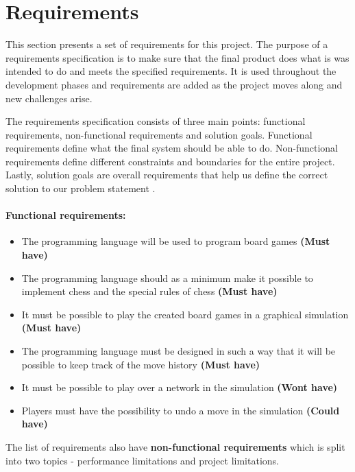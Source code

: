 \section{Requirements}

This section presents a set of requirements for this project. The purpose of a requirements specification is to make sure that the final product does what is was intended to do and meets the specified requirements. It is used throughout the development phases and requirements are added as the project moves along and new challenges arise.

The requirements specification consists of three main points: functional requirements, non-functional requirements and solution goals. Functional requirements define what the final system should be able to do. Non-functional requirements define different constraints and boundaries for the entire project. Lastly, solution goals are overall requirements that help us define the correct solution to our problem statement \cite{requirementsGuide}.


\paragraph*{Functional requirements:}
\begin{itemize}[noitemsep]
  \item The programming language will be used to program board games \textbf{(Must have)}
  \item The programming language should as a minimum make it possible to implement chess and the special rules of chess \textbf{(Must have)}
  \item It must be possible to play the created board games in a graphical simulation \textbf{(Must have)}
  \item The programming language must be designed in such a way that it will be possible to keep track of the move history \textbf{(Must have)}
  \item It must be possible to play over a network in the simulation \textbf{(Wont have)}
  \item Players must have the possibility to undo a move in the simulation \textbf{(Could have)}
\end{itemize}

The list of requirements also have \textbf{non-functional requirements} which is split into two topics - performance limitations and project limitations.

